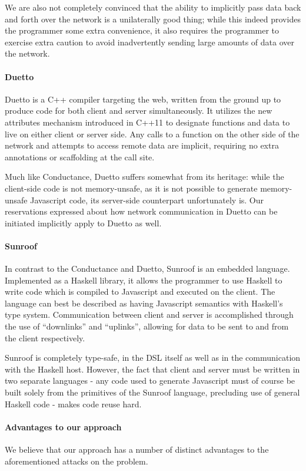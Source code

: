 \documentclass[preprint]{sigplanconf}
\begin{document}
We are also not completely convinced that the ability to implicitly pass data
back and forth over the network is a unilaterally good thing; while this indeed
provides the programmer some extra convenience, it also requires the programmer
to exercise extra caution to avoid inadvertently sending large amounts of data
over the network.

\paragraph{Duetto} Duetto is a C++ compiler targeting the web, written from
the ground up to produce code for both client and server simultaneously. It
utilizes the new attributes mechanism introduced in C++11 to designate
functions and data to live on either client or server side. Any calls to a
function on the other side of the network and attempts to access remote data
are implicit, requiring no extra annotations or scaffolding at the call site.

Much like Conductance, Duetto suffers somewhat from its heritage: while the
client-side code is not memory-unsafe, as it is not possible to generate
memory-unsafe Javascript code, its server-side counterpart unfortunately is.
Our reservations expressed about how network communication in Duetto can be
initiated implicitly apply to Duetto as well.

\paragraph{Sunroof} In contrast to the Conductance and Duetto, Sunroof is an
embedded language. Implemented as a Haskell library, it allows the programmer
to use Haskell to write code which is compiled to Javascript and executed on
the client. The language can best be described as having Javascript semantics
with Haskell's type system. Communication between client and server is
accomplished through the use of ``downlinks'' and ``uplinks'', allowing for
data to be sent to and from the client respectively.

Sunroof is completely type-safe, in the DSL itself as well as in the
communication with the Haskell host. However, the fact that client and server
must be written in two separate languages - any code used to generate
Javascript must of course be built solely from the primitives of the Sunroof
language, precluding use of general Haskell code - makes code reuse hard.

\paragraph{Advantages to our approach} We believe that our approach has a
number of distinct advantages to the aforementioned attacks on the problem.
\end{document}
